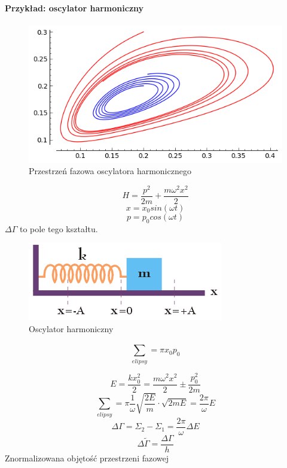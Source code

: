\documentclass{article}
\begin{document}
		\paragraph{Przykład: oscylator harmoniczny}
		\begin{figure}[ht]
			\label{fig:fig1}
			\centering
			\includegraphics[scale=0.5]{przestrzenfazowa.png}
			\caption{Przestrzeń fazowa oscylatora harmonicznego}
		\end{figure}
		\begin{equation}
		H = \frac{p^2}{2m} + \frac{m\omega^2x^2}{2}
		\end{equation}
		\begin{equation}
		x=x_0sin(\omega t)
		\end{equation}
		\begin{equation}
		p=p_0cos(\omega t)
		\end{equation}
		$ \Delta \Gamma $ to pole tego kształtu.
		\begin{figure}[ht]
			\label{fig:fig1}
			\centering
			\includegraphics[scale=0.5]{oscylator.png}
			\caption{Oscylator harmoniczny}
		\end{figure}
		\begin{equation}
		\sum_{elipsy}^{} = \pi x_0p_0
		\end{equation}		
		
		\begin{equation}
			E = \frac{kx_0^2}{2} = \frac{m\omega^2x^2}{2} \pm \frac{p_0^2}{2m}
		\end{equation}
		\begin{equation}
		\sum_{elipsy}^{} = 
		\pi \frac{1}{\omega}\sqrt{\frac{2E}{m}}\cdot \sqrt{2mE} = 
		\frac{2\pi}{\omega}E
		\end{equation}
		\begin{equation}
		\Delta \Gamma = \Sigma_2 - \Sigma_1 = \frac{2\pi}{\omega}\Delta E
		\end{equation}
		\begin{equation}
		\Delta \tilde{\Gamma} = \frac{\Delta\Gamma}{h}
		\end{equation}
		Znormalizowana objętość przestrzeni fazowej
\end{document}
